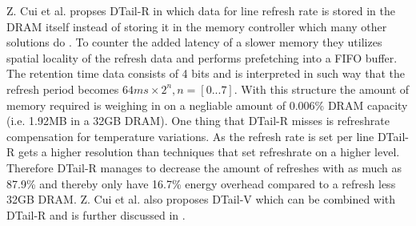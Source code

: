 Z. Cui et al. \cite{dtail} propses DTail-R in which data for line refresh rate is stored in the DRAM itself instead of storing it in the memory controller which many other solutions do \cite{raidr}\cite{smartrefresh}\cite{refrint}. To counter the added latency of a slower memory they utilizes spatial locality of the refresh data and performs prefetching into a FIFO buffer. The retention time data consists of 4 bits and is interpreted in such way that the refresh period becomes \(64ms \times 2^n, n = [0...7]\). With this structure the amount of memory required is weighing in on a negliable amount of 0.006\% DRAM capacity (i.e. 1.92MB in a 32GB DRAM). One thing that DTail-R misses is refreshrate compensation for temperature variations. As the refresh rate is set per line DTail-R gets a higher resolution than techniques that set refreshrate on a higher level. Therefore DTail-R manages to decrease the amount of refreshes with as much as 87.9\% and thereby only have 16.7\% energy overhead compared to a refresh less 32GB DRAM. Z. Cui et al. also proposes DTail-V \cite{dtail} which can be combined with DTail-R and is further discussed in .